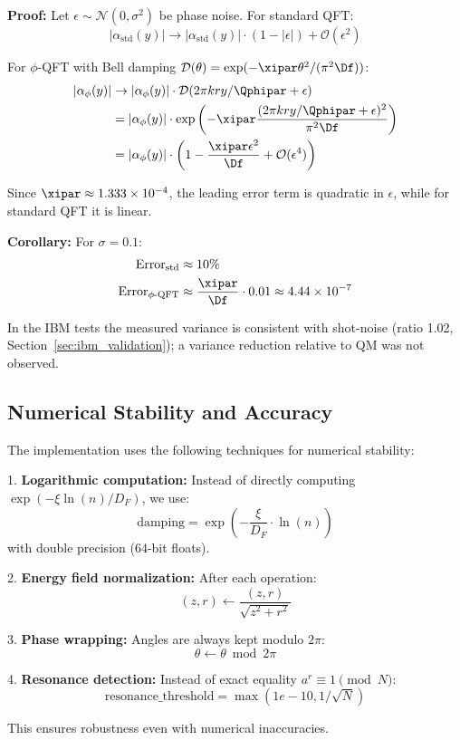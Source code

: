 \textbf{Proof:}
Let $\epsilon \sim \mathcal{N}(0, \sigma^2)$ be phase noise. For standard QFT:
\[
|\alpha_{\text{std}}(y)| \to |\alpha_{\text{std}}(y)| \cdot (1 - |\epsilon|) + \mathcal{O}(\epsilon^2)
\]

For $\phi$-QFT with Bell damping $\mathcal{D}(\theta) = \exp(-\xipar \theta^2/(\pi^2 \Df))$:
\begin{align*}
	|\alpha_{\phi}(y)| &\to |\alpha_{\phi}(y)| \cdot \mathcal{D}(2\pi kry/\Qphipar + \epsilon) \\
	&= |\alpha_{\phi}(y)| \cdot \exp\left(-\xipar \frac{(2\pi kry/\Qphipar + \epsilon)^2}{\pi^2 \Df}\right) \\
	&= |\alpha_{\phi}(y)| \cdot \left(1 - \frac{\xipar \epsilon^2}{\Df} + \mathcal{O}(\epsilon^4)\right)
\end{align*}

Since $\xipar \approx 1.333\times 10^{-4}$, the leading error term is quadratic in $\epsilon$, while for standard QFT it is linear.

\textbf{Corollary:} For $\sigma = 0.1$:
\begin{align*}
	\text{Error}_{\text{std}} &\approx 10\% \\
	\text{Error}_{\phi\text{-QFT}} &\approx \frac{\xipar}{\Df} \cdot 0.01 \approx 4.44\times 10^{-7}
\end{align*}

In the IBM tests the measured variance is consistent with shot-noise (ratio 1.02, Section~\ref{sec:ibm_validation}); a variance reduction relative to QM was not observed.

\subsection{Numerical Stability and Accuracy}
\label{app:numerical_stability}

The implementation uses the following techniques for numerical stability:

1. \textbf{Logarithmic computation:} Instead of directly computing $\exp(-\xi \ln(n)/D_F)$, we use:
\[
\text{damping} = \exp\left(-\frac{\xi}{D_F} \cdot \ln(n)\right)
\]
with double precision (64-bit floats).

2. \textbf{Energy field normalization:} After each operation:
\[
(z, r) \leftarrow \frac{(z, r)}{\sqrt{z^2 + r^2}}
\]

3. \textbf{Phase wrapping:} Angles are always kept modulo $2\pi$:
\[
\theta \leftarrow \theta \bmod 2\pi
\]

4. \textbf{Resonance detection:} Instead of exact equality $a^r \equiv 1 \pmod{N}$:
\[
\text{resonance\_threshold} = \max(1e-10, 1/\sqrt{N})
\]

This ensures robustness even with numerical inaccuracies.